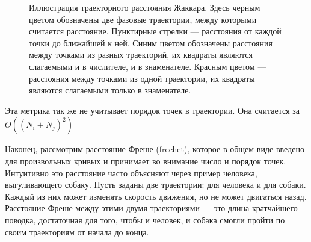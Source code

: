 \begin{figure}[htb]
  \centering
  \caption{Иллюстрация траекторного расстояния Жаккара. Здесь черным цветом обозначены две фазовые траектории, между которыми считается расстояние. Пунктирные стрелки --- расстояния от каждой точки до ближайшей к ней. Синим цветом обозначены расстояния между точками из разных траекторий, их квадраты являются слагаемыми и в числителе, и в знаменателе. Красным цветом --- расстояния между точками из одной траектории, их квадраты являются слагаемыми только в знаменателе.}
  \label{jaccard-tr}
\end{figure}

Эта метрика так же не учитывает порядок точек в траектории. Она считается за $O((N_i + N_j)^2)$

Наконец, рассмотрим расстояние Фреше (frechet), которое в общем виде введено для произвольных кривых и принимает во внимание число и порядок точек. Интуитивно это расстояние часто объясняют через пример человека, выгуливающего собаку. Пусть заданы две траектории: для человека и для собаки. Каждый из них может изменять скорость движения, но не может двигаться назад. Расстояние Фреше между этими двумя траекториями --- это длина кратчайшего поводка, достаточная для того, чтобы и человек, и собака смогли пройти по своим траекториям от начала до конца.

